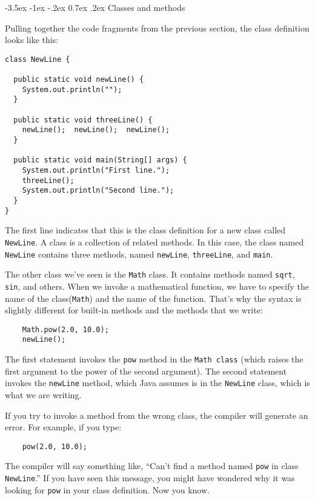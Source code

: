 \documentclass{book}
\makeatletter
\renewcommand{\section}{\@startsection 
    {section} {1} {0mm}%
    {-3.5ex \@plus -1ex \@minus -.2ex}%
    {0.7ex \@plus.2ex}%
    {\normalfont\Large\bfseries}}
\makeatother
\begin{document}
\section{Classes and methods}

Pulling together the code fragments from the previous
section, the class definition looks like this:

\begin{verbatim}
class NewLine {

  public static void newLine() {
    System.out.println("");
  }

  public static void threeLine() {
    newLine();  newLine();  newLine();
  }

  public static void main(String[] args) {
    System.out.println("First line.");
    threeLine();
    System.out.println("Second line.");
  }
}
\end{verbatim}
%
The first line indicates that this is the class definition for a new
class called {\tt NewLine}.  A class is a collection of related
methods.  In this case, the class named {\tt NewLine} contains three
methods, named {\tt newLine}, {\tt threeLine}, and {\tt main}.

The other class we've seen is the {\tt Math} class.  It contains
methods named {\tt sqrt}, {\tt sin}, and others.  When
we invoke a mathematical function, we have to specify
the name of the class({\tt Math}) and the name of the function.
That's why the syntax is slightly different for built-in
methods and the methods that we write:

\begin{verbatim}
    Math.pow(2.0, 10.0);
    newLine();
\end{verbatim}
%
The first statement invokes the {\tt pow} method in
the {\tt Math class} (which raises the first argument to the
power of the second argument).  The second statement invokes
the {\tt newLine} method, which Java assumes 
is in the {\tt NewLine} class, which is what we are writing.

If you try to invoke a method from the wrong class, the
compiler will generate an error.  For example, if you
type:

\begin{verbatim}
    pow(2.0, 10.0);
\end{verbatim}
%
The compiler will say something like, ``Can't find a method
named {\tt pow} in class {\tt NewLine}.''  If you have
seen this message, you might have wondered why it was looking
for {\tt pow} in your class definition.  Now you know.
\end{document}
